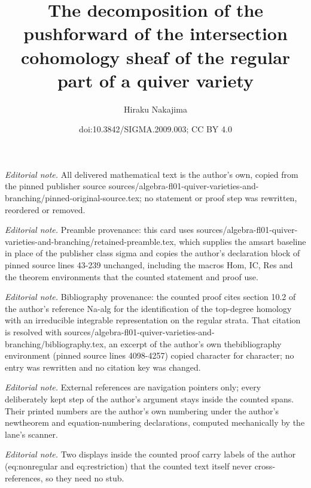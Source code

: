 \documentclass[10pt,a4paper]{amsart}
\title{The decomposition of the pushforward of the intersection cohomology sheaf of the regular part of a quiver variety}
\author{Hiraku Nakajima}
\date{doi:10.3842/SIGMA.2009.003; CC BY 4.0}
\theoremstyle{definition}
\numberwithin{equation}{section}
\begin{document}
\maketitle
\noindent\textit{Editorial note.} All delivered mathematical text is the author's own, copied from the pinned publisher source sources/algebra-fl01-quiver-varieties-and-branching/pinned-original-source.tex; no statement or proof step was rewritten, reordered or removed.\par\medskip
\noindent\textit{Editorial note.} Preamble provenance: this card uses sources/algebra-fl01-quiver-varieties-and-branching/retained-preamble.tex, which supplies the amsart baseline in place of the publisher class sigma and copies the author's declaration block of pinned source lines 43-239 unchanged, including the macros Hom, IC, Res and the theorem environments that the counted statement and proof use.\par\medskip
\noindent\textit{Editorial note.} Bibliography provenance: the counted proof cites section 10.2 of the author's reference Na-alg for the identification of the top-degree homology with an irreducible integrable representation on the regular strata. That citation is resolved with sources/algebra-fl01-quiver-varieties-and-branching/bibliography.tex, an excerpt of the author's own thebibliography environment (pinned source lines 4098-4257) copied character for character; no entry was rewritten and no citation key was changed.\par\medskip
\noindent\textit{Editorial note.} External references are navigation pointers only; every deliberately kept step of the author's argument stays inside the counted spans. Their printed numbers are the author's own numbering under the author's newtheorem and equation-numbering declarations, computed mechanically by the lane's scanner.\par\medskip
\noindent\textit{Editorial note.} Two displays inside the counted proof carry labels of the author (eq:nonregular and eq:restriction) that the counted text itself never cross-references, so they need no stub.\par\medskip
\end{document}
